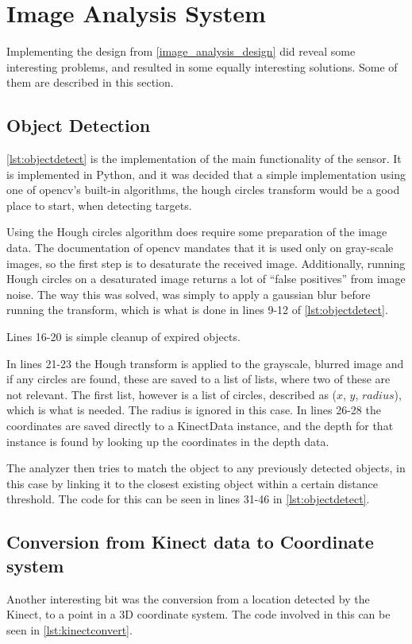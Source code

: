 \section{Image Analysis System}

Implementing the design from \autoref{image_analysis_design} did reveal some interesting problems, and resulted in
some equally interesting solutions. Some of them are described in this section.

\subsection{Object Detection}
\autoref{lst:objectdetect} is the implementation of the main functionality of the sensor. It is implemented in Python, and it was decided that a simple implementation using one of \ac{opencv}'s built-in algorithms, the hough circles transform would be a good place to start, when detecting targets.



Using the Hough circles algorithm does require some preparation of the image data.
The documentation of \ac{opencv} mandates that it is used only on gray-scale images, so the first step is to desaturate the received image. Additionally, running Hough circles on a desaturated image returns a lot of ``false positives'' from image noise. The way
this was solved, was simply to apply a gaussian blur before running the transform, which is what is done in lines 9-12 of \autoref{lst:objectdetect}. 

Lines 16-20 is simple cleanup of expired objects.

In lines 21-23 the Hough transform is applied to the grayscale, blurred image and if any circles are found, these are saved to a list of lists, where two of these are not relevant. The first list, however is a list of circles, described as ($x$, $y$, $radius$), which is what is needed. The radius is ignored in this case. In lines  26-28 the coordinates are saved directly to a KinectData instance, and the depth for that instance is found by looking up the coordinates in the depth data.

The analyzer then tries to match the object to any previously detected objects, in this case by linking it to the closest
existing object within a certain distance threshold. The code for this can be seen in lines 31-46 in \autoref{lst:objectdetect}. 

\subsection{Conversion from Kinect data to Coordinate system}
Another interesting bit
was the conversion from a location detected by the Kinect, to a point in a 3D coordinate system. The code involved
in this can be seen in \autoref{lst:kinectconvert}. 

